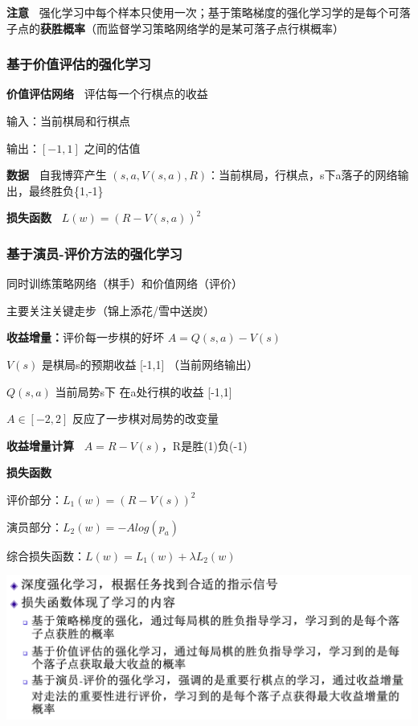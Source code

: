 \documentclass[b4paper, 10pt]{ctexart}
\makeatletter
\newenvironment{figurehere}
{\def\@captype{figure}}
{}
\makeatother
\begin{document}
\begin{multicols}{3}
\textbf{注意\ } 强化学习中每个样本只使用一次；基于策略梯度的强化学习学的是每个可落子点的\textbf{获胜概率}（而监督学习策略网络学的是某可落子点行棋概率）

\subsubsection{基于价值评估的强化学习}

\textbf{价值评估网络\ } 评估每一个行棋点的收益

输入：当前棋局和行棋点

输出：$[-1,1]$ 之间的估值

\textbf{数据\ } 自我博弈产生 $(s,a,V(s,a),R)$：当前棋局，行棋点，s下a落子的网络输出，最终胜负\{1,-1\}

\textbf{损失函数\ } $L(w) = (R-V(s,a))^2$

\subsubsection{基于演员-评价方法的强化学习}

同时训练策略网络（棋手）和价值网络（评价）

主要关注关键走步（锦上添花/雪中送炭）

\textbf{收益增量：}评价每一步棋的好坏 $A=Q(s,a)-V(s)$

$V(s)$ 是棋局s的预期收益 [-1,1] （当前网络输出）

$Q(s,a)$ 当前局势s下 在a处行棋的收益 [-1,1]

$A\in [-2,2]$ 反应了一步棋对局势的改变量

\textbf{收益增量计算\ } $A=R-V(s)$，R是胜(1)负(-1)

\textbf{损失函数\ }

评价部分：$L_1(w)=(R-V(s))^2$

演员部分：$L_2(w)=-Alog(p_a)$

综合损失函数：$L(w)=L_1(w)+\lambda L_2(w)$

\begin{figurehere}
    \centering    \includegraphics[width=0.95\linewidth]{figs/DRL.png}
    \label{fig:AlphaGo-DRL}
\end{figurehere}


\end{multicols}
\end{document}
